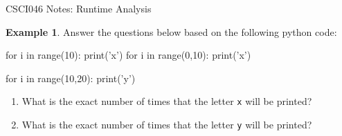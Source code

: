 \documentclass[10pt]{article}
\theoremstyle{definition}
\newtheorem{example}{Example}
\begin{document}
\begin{center}
    {
\Large
CSCI046 Notes: Runtime Analysis
}

\end{center}

\vspace{0.25in}
\noindent

\begin{example}
Answer the questions below based on the following python code:
\begin{python}
for i in range(10):
    print('x')
for i in range(0,10):
    print('x')

for i in range(10,20):
    print('y')
\end{python}
    \begin{enumerate}
        \item What is the exact number of times that the letter \texttt{x} will be printed?
            \vspace{1.5in}
        \item What is the exact number of times that the letter \texttt{y} will be printed?
    \end{enumerate}
\end{example}
\end{document}
